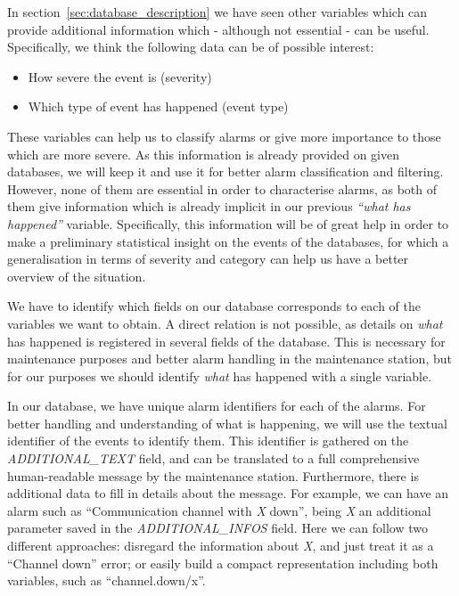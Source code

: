 In section~\ref{sec:database_description} we have seen other variables which can provide additional information which - although not essential - can be useful. Specifically, we think the following data can be of possible interest:

\begin{itemize}
\item How severe the event is (severity)
\item Which type of event has happened (event type)
\end{itemize}

These variables can help us to classify alarms or give more importance to those which are more severe. As this information is already provided on given databases, we will keep it and use it for better alarm classification and filtering. However, none of them are essential in order to characterise alarms, as both of them give information which is already implicit in our previous \emph{``what has happened''} variable. Specifically, this information will be of great help in order to make a preliminary statistical insight on the events of the databases, for which a generalisation in terms of severity and category can help us have a better overview of the situation.

We have to identify which fields on our database corresponds to each of the variables we want to obtain. A direct relation is not possible, as details on \emph{what} has happened is registered in several fields of the database. This is necessary for maintenance purposes and better alarm handling in the maintenance station, but for our purposes we should identify \emph{what} has happened with a single variable.

In our database, we have unique alarm identifiers for each of the alarms. For better handling and understanding of what is happening, we will use the textual identifier of the events to identify them. This identifier is gathered on the \emph{ADDITIONAL\_TEXT} field, and can be translated to a full comprehensive human-readable message by the maintenance station. Furthermore, there is additional data to fill in details about the message. For example, we can have an alarm such as ``Communication channel with \emph{X} down'', being \emph{X} an additional parameter saved in the \emph{ADDITIONAL\_INFOS} field. Here we can follow two different approaches: disregard the information about \emph{X}, and just treat it as a ``Channel down'' error; or easily build a compact representation including both variables, such as ``channel.down/x''.

